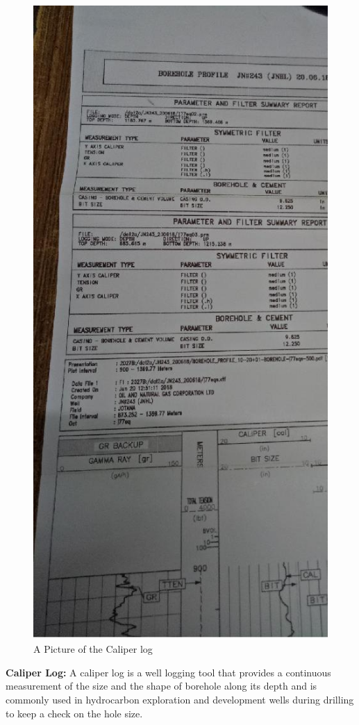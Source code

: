 \begin{enumerate}
\begin{figure}[H]
\includegraphics[scale=0.3]{images/Log}
\centering 
\caption{A Picture of the Caliper log}
\end{figure}

\textbf{Caliper Log:} A caliper log is a well logging tool that provides a
continuous measurement of the size and the shape of borehole along
its depth and is commonly used in hydrocarbon exploration and
development wells during drilling to keep a check on the hole size.


\end{enumerate}
